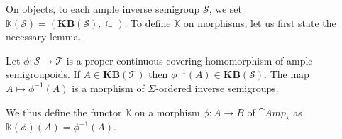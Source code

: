 On objects, to each ample inverse semigroup $\mathcal{S}$, we set $\mathbb{K}(\mathcal{S})=(\mathbf{KB}(\mathcal{S}),\subseteq)$. To define $\mathbb{K}$ on morphisms, let us first state the necessary lemma.

\begin{lemma}\label{lem:functorkonmorphisms}
    Let $\phi\colon\mathcal{S}\to\mathcal{T}$ is a proper continuous covering homomorphism of ample semigroupoids. If $A\in\mathbf{KB}(\mathcal{T})$ then $\phi^{-1}(A)\in\mathbf{KB}(\mathcal{S})$. The map $A\mapsto\phi^{-1}(A)$ is a morphism of $\Sigma$-ordered inverse semigroups.
\end{lemma}

We thus define the functor $\mathbb{K}$ on a morphism $\phi\colon A\to B$ of $\cat{Amp}_\star$ as $\mathbb{K}(\phi)(A)=\phi^{-1}(A)$.

